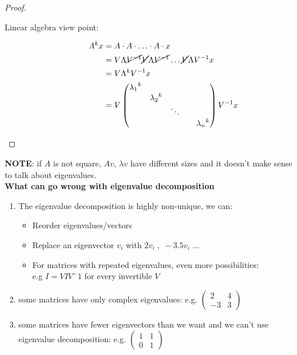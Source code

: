 \documentclass[computationalMathematics.tex]{subfiles}
\begin{document}
\begin{proof}
  \begin{description}
  \item[{\sc Linear algebra view point:}]
    \begin{equation}
      \begin{split}
        A^k x &= A \cdot A \cdot \ldots \cdot A \cdot x\\
        &=V \Lambda \cancel{{V}^{-1}} \cancel{V} \Lambda \cancel{{V}^{-1}} \ldots \cancel{V} \Lambda {V}^{-1} x\\
        &= V \Lambda^k {V}^{-1} x\\
        &=V \begin{pmatrix}
          {\lambda_1}^k\\
          & {\lambda_2}^k\\
          && \ddots\\
          &&&& {\lambda_n}^k\\
        \end{pmatrix}
        {V}^{-1} x
      \end{split}
    \end{equation}

  \end{description}
\end{proof}

\noindent \textbf{NOTE}: if $A$ is not square, $Av$, $\lambda v$ have different sizes and it doesn't make sense to talk about eigenvalues.\\

\noindent \textbf{What can go wrong with eigenvalue decomposition}
\begin{enumerate}
    \item  The eigenvalue decomposition is highly non-unique, we can:
    \begin{itemize}
        \item Reorder eigenvalues/vectors
        \item Replace an eigenvector $v_i$ with $2v_i \;,\; −3.5v_i\; \dots$
        \item For matrices with repeated eigenvalues, even more possibilities:\\
        e.g $I = VIV^-1$ for every invertible $V$
    \end{itemize}
    
    \item  some matrices have only complex eigenvalues: e.g. $\begin{pmatrix} 2 & 4\\ -3 & 3\end{pmatrix}$
    
    \item some matrices have fewer eigenvectors than we want and we can't use eigenvalue decomposition: e.g. $\begin{pmatrix} 1 & 1\\ 0 & 1\end{pmatrix}$
    
\end{enumerate}
\end{document}
